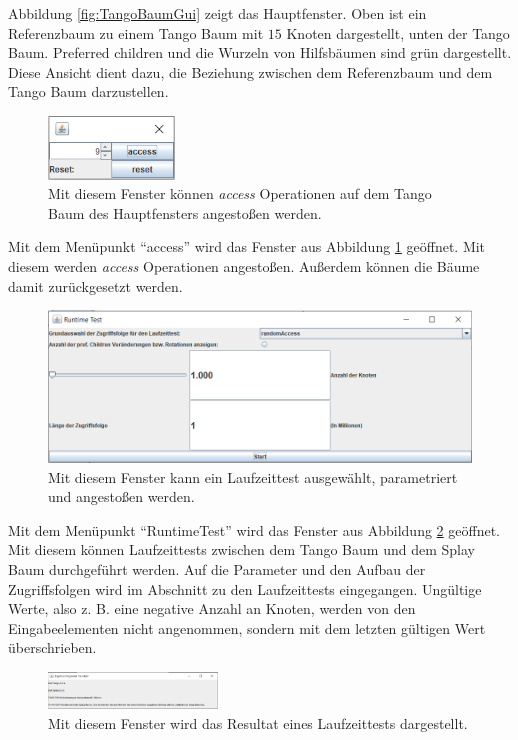 \documentclass[a4paper,12pt]{article}
\begin{document}
\noindent Abbildung \ref{fig:TangoBaumGui} zeigt das Hauptfenster. Oben ist ein Referenzbaum zu einem Tango Baum mit  $15$ Knoten dargestellt, unten der Tango Baum. Preferred children und die Wurzeln von Hilfsbäumen sind grün dargestellt.
Diese Ansicht dient dazu, die Beziehung zwischen dem Referenzbaum und dem Tango Baum darzustellen.

\begin{figure}[H]
	\centering
	\includegraphics[width=0.3\textwidth]{Medien/laufzeittest/accessGUI}
	\caption{Mit diesem Fenster können  \textit{access} Operationen auf dem Tango Baum des Hauptfensters angestoßen werden.}
	\label{fig:accessGui}
\end{figure}
\noindent Mit dem Menüpunkt \enquote{access} wird das Fenster aus Abbildung \ref{fig:accessGui} geöffnet. Mit diesem werden \textit{access} Operationen angestoßen. Außerdem können die Bäume damit zurückgesetzt werden.

\begin{figure}[H]
	\centering
	\includegraphics[width=1\textwidth]{Medien/laufzeittest/RuntimeGui}
	\caption{Mit diesem Fenster kann ein Laufzeittest ausgewählt, parametriert und angestoßen werden.}
	\label{fig:RuntimeGui}
\end{figure}

\noindent Mit dem Menüpunkt \enquote{RuntimeTest} wird das Fenster aus Abbildung \ref{fig:RuntimeGui} geöffnet. Mit diesem können Laufzeittests zwischen dem Tango Baum und dem Splay Baum  durchgeführt werden. Auf die Parameter und den Aufbau der Zugriffsfolgen wird im Abschnitt zu den Laufzeittests eingegangen. Ungültige Werte, also z. B. eine negative Anzahl an Knoten, werden von den Eingabeelementen nicht angenommen, sondern mit dem letzten gültigen Wert überschrieben.


\begin{figure}[H]
	\centering
	\includegraphics[width=0.4\textwidth]{Medien/laufzeittest/ResultGUI}
	\caption{Mit diesem Fenster wird das Resultat eines Laufzeittests dargestellt.}
	\label{fig:ResultGUI}
\end{figure}
\end{document}
